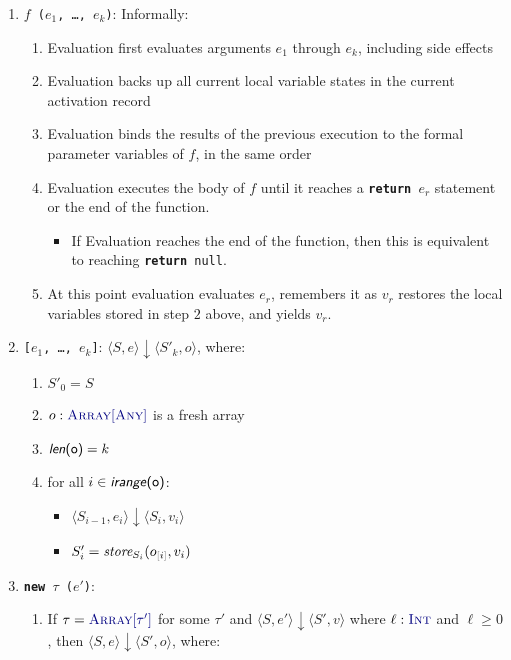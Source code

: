 \documentclass{article}
\newcommand{\tuple}[1]{\ensuremath{\langle #1 \rangle}}
\newcommand{\vterminal}[1]{\textsf{\textcolor{dgreen}{\texttt{#1}}}}
\newcommand{\Ty}[1]{\textcolor{dblue}{#1}}
\newcommand{\Ckw}[1]{{\textsf{\textbf{#1}}}}
\newcommand{\TInt}{\Ty{\textsc{Int}}}
\newcommand{\TAny}{\Ty{\textsc{Any}}}
\newcommand{\TArrayof}[1]{\Ty{\textsc{Array}[#1]}}
\newcommand{\arraylength}[1]{\textsf{\textit{len}(#1)}}
\newcommand{\arrayindices}[1]{\textsf{\textit{irange}(#1)}}
\newcommand{\arrsub}[2]{#1_{\textcolor{gray}{[}#2\textcolor{gray}{]}}}
\begin{document}
\begin{enumerate}
\begin{enumerate}
  \item \vterminal{$f$ ($e_1$, \ldots, $e_k$)}: Informally:
    \begin{enumerate}
      \item Evaluation first evaluates arguments $e_1$ through $e_k$, including side effects
      \item Evaluation backs up all current local variable states in the current activation record
      \item Evaluation binds the results of the previous execution to the formal parameter variables of $f$, in the same order
      \item Evaluation executes the body of $f$ until it reaches a \vterminal{\Ckw{return} $e_r$} statement or the end of the function.
        \begin{itemize}
          \item If Evaluation reaches the end of the function, then this is equivalent to reaching \vterminal{\Ckw{return} null}.
        \end{itemize}
      \item At this point evaluation evaluates $e_r$, remembers it as $v_r$ restores the local variables stored in step $2$ above, and yields $v_r$.
    \end{enumerate}
  \item \vterminal{[$e_1$, \ldots, $e_k$]}: $\tuple{S,e} \downarrow \tuple{S'_k,o}$, where:
    \begin{enumerate}
      \item $S'_0 = S$
      \item $o : \TArrayof{\TAny}$ is a fresh array
      \item $\arraylength{o} = k$
      \item for all $i \in \arrayindices{o}$:
        \begin{itemize}
          \item $\tuple{S_{i-1},e_i} \downarrow \tuple{S_i, v_i}$
          \item $S'_i = \textit{store}_{S_i}(\arrsub{o}{i}, v_i)$
        \end{itemize}
    \end{enumerate}
  \item \vterminal{\Ckw{new} $\tau$ ($e'$)}:
    \begin{enumerate}
    \item If $\tau = \TArrayof{\tau'}$ for some $\tau'$ and $\tuple{S,e'} \downarrow \tuple{S',v}$ where $\ell : \TInt$ and $\ell \ge 0$, then $\tuple{S,e} \downarrow \tuple{S',o}$, where:

\end{enumerate}
\end{enumerate}
\end{enumerate}
\end{document}
